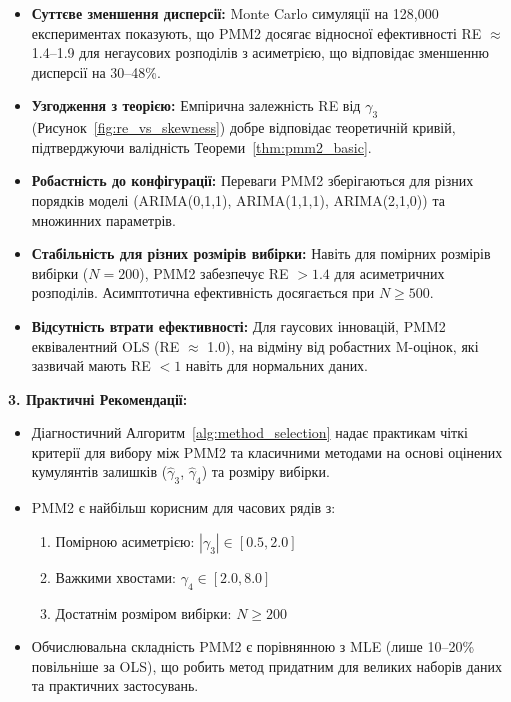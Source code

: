 \documentclass[12pt,a4paper]{article}
\begin{document}
	\begin{itemize}
		\item \textbf{Суттєве зменшення дисперсії:} Monte Carlo симуляції на 128,000 експериментах показують, що PMM2 досягає відносної ефективності RE $\approx$ 1.4--1.9 для негаусових розподілів з асиметрією, що відповідає зменшенню дисперсії на 30--48\%.
		
		\item \textbf{Узгодження з теорією:} Емпірична залежність RE від $\gamma_3$ (Рисунок~\ref{fig:re_vs_skewness}) добре відповідає теоретичній кривій, підтверджуючи валідність Теореми~\ref{thm:pmm2_basic}.
		
		\item \textbf{Робастність до конфігурації:} Переваги PMM2 зберігаються для різних порядків моделі (ARIMA(0,1,1), ARIMA(1,1,1), ARIMA(2,1,0)) та множинних параметрів.
		
		\item \textbf{Стабільність для різних розмірів вибірки:} Навіть для помірних розмірів вибірки ($N = 200$), PMM2 забезпечує RE $> 1.4$ для асиметричних розподілів. Асимптотична ефективність досягається при $N \geq 500$.
		
		\item \textbf{Відсутність втрати ефективності:} Для гаусових інновацій, PMM2 еквівалентний OLS (RE $\approx$ 1.0), на відміну від робастних M-оцінок, які зазвичай мають RE $< 1$ навіть для нормальних даних.
	\end{itemize}
	
	\textbf{3. Практичні Рекомендації:}
	
	\begin{itemize}
		\item Діагностичний Алгоритм~\ref{alg:method_selection} надає практикам чіткі критерії для вибору між PMM2 та класичними методами на основі оцінених кумулянтів залишків ($\hat{\gamma}_3$, $\hat{\gamma}_4$) та розміру вибірки.
		
		\item PMM2 є найбільш корисним для часових рядів з:
		\begin{enumerate}
			\item Помірною асиметрією: $|\gamma_3| \in [0.5, 2.0]$
			\item Важкими хвостами: $\gamma_4 \in [2.0, 8.0]$
			\item Достатнім розміром вибірки: $N \geq 200$
		\end{enumerate}
		
		\item Обчислювальна складність PMM2 є порівнянною з MLE (лише 10--20\% повільніше за OLS), що робить метод придатним для великих наборів даних та практичних застосувань.
	\end{itemize}
	
\end{document}
